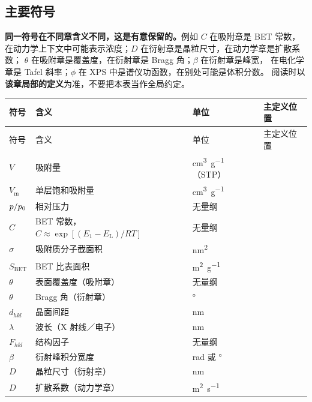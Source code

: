 \widepageson

\subsection{主要符号}

\begin{pitfall}
\textbf{同一符号在不同章含义不同，这是有意保留的。}例如 $C$ 在吸附章是
BET 常数，在动力学上下文中可能表示浓度；$D$ 在衍射章是晶粒尺寸，在动力学章是扩散系数；
$\theta$ 在吸附章是覆盖度，在衍射章是 Bragg 角；$\beta$ 在衍射章是峰宽，
在电化学章是 Tafel 斜率；$\phi$ 在 XPS 中是谱仪功函数，在别处可能是体积分数。
阅读时以\textbf{该章局部的定义}为准，不要把本表当作全局约定。
\end{pitfall}

\vspace{2mm}
{\srcsize
\begin{xltabular}{\textwidth}{@{}p{22mm}p{60mm}X p{17mm}@{}}
\toprule
符号 & 含义 & 单位 & 主定义位置 \\
\midrule
\endfirsthead
\toprule
符号 & 含义 & 单位 & 主定义位置 \\
\midrule
\endhead
\bottomrule
\endlastfoot
$V$ & 吸附量 & \unit{cm^3.g^{-1}}（STP） &  \\
$V_{\mathrm{m}}$ & 单层饱和吸附量 & \unit{cm^3.g^{-1}} &  \\
$p/p_{0}$ & 相对压力 & 无量纲 &  \\
$C$ & BET 常数，$C\approx\exp[(E_1-E_{\mathrm{L}})/RT]$ & 无量纲 &  \\
$\sigma$ & 吸附质分子截面积 & \unit{nm^2} &  \\
$S_{\mathrm{BET}}$ & BET 比表面积 & \unit{m^2.g^{-1}} &  \\
$\theta$ & 表面覆盖度（吸附章） & 无量纲 &  \\
$\theta$ & Bragg 角（衍射章） & ° &  \\
$d_{hkl}$ & 晶面间距 & \unit{nm} &  \\
$\lambda$ & 波长（X 射线／电子） & \unit{nm} &  \\
$F_{hkl}$ & 结构因子 & 无量纲 &  \\
$\beta$ & 衍射峰积分宽度 & \unit{rad} 或 ° &  \\
$D$ & 晶粒尺寸（衍射章） & \unit{nm} &  \\
$D$ & 扩散系数（动力学章） & \unit{m^2.s^{-1}} &  \\

\end{xltabular}}
